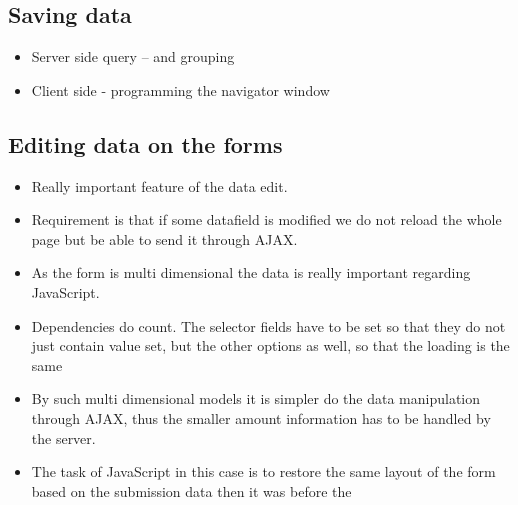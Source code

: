 \subsection{Saving data}

\begin{itemize}
	\item Server side query – and grouping
	\item Client side - programming the navigator window
\end{itemize}	



\subsection{Editing data on the forms}


\begin{itemize}
	\item Really important feature of the data edit.
	\item Requirement is that if some datafield is modified we do not reload the whole page but be able to send it through AJAX.
	\item As the form is multi dimensional the data is really important regarding JavaScript.
	\item Dependencies do count. The selector fields have to be set so that they do not just contain value set, but the other options as well, so that the loading is the same
	\item By such multi dimensional models it is simpler do the data manipulation through AJAX, thus the smaller amount information has to be handled by the server.
	\item The task of JavaScript in this case is to restore the same layout of the form based on the submission data then it was before the  
\end{itemize}	













